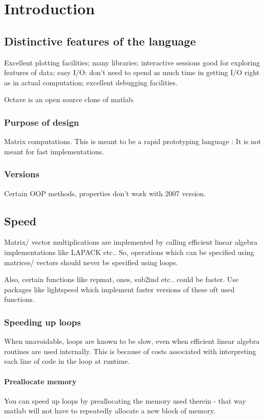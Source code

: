 \documentclass[oneside, article]{memoir}
\begin{document}
\section{Introduction}
\subsection{Distinctive features of the language}
Excellent plotting facilities; many libraries; interactive sessions good for exploring features of data; easy I/O: don't need to spend as much time in getting I/O right as in actual computation; excellent debugging facilities.

Octave is an open source clone of matlab.

\subsubsection{Purpose of design}
Matrix computations. This is meant to be a rapid prototyping language : It is not meant for fast implementations.

\subsubsection{Versions}
Certain OOP methods, properties don't work with 2007 version.

\subsection{Speed}
Matrix/ vector multiplications are implemented by calling efficient linear algebra implementations like LAPACK etc.. So, operations which can be specified using matrices/ vectors should never be specified using loops.

Also, certain functions like repmat, ones, sub2ind etc.. could be faster. Use packages like lightspeed which implement faster versions of these oft used functions.

\subsubsection{Speeding up loops}
When unavoidable, loops are known to be slow, even when efficient linear algebra routines are used internally. This is because of costs associated with interpreting each line of code in the loop at runtime.

\paragraph{Preallocate memory}
You can speed up loops by preallocating the memory used therein - that way matlab will not have to repeatedly allocate a new block of memory.
\end{document}
